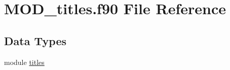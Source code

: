 \hypertarget{MOD__titles_8f90}{\section{M\-O\-D\-\_\-titles.\-f90 File Reference}
\label{MOD__titles_8f90}
}
\subsection*{Data Types}
\begin{DoxyCompactItemize}
\item 
module \hyperlink{classtitles}{titles}
\end{DoxyCompactItemize}
